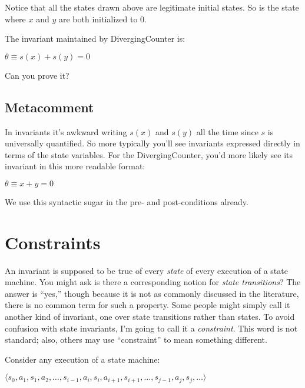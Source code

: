 \noindent Notice that all the states drawn above are legitimate initial states.
So is the state where $x$ and $y$ are both initialized to 0.

The invariant maintained by DivergingCounter is:

\begin{center}
$\theta \equiv s(x) + s(y) = 0$
\end{center}

\noindent Can you prove it?

\subsection{Metacomment}

In invariants it's awkward writing $s(x)$ and $s(y)$ all
the time since $s$ is universally quantified.  So more typically
you'll see invariants expressed directly in terms of the state
variables.
For the DivergingCounter, you'd more likely see its invariant in this
more readable format:

\begin{center}
$\theta \equiv x + y = 0$
\end{center}

\noindent We use this syntactic sugar
in the pre- and post-conditions already.
\section{Constraints}

An invariant is supposed to be true of every {\em state}
of every execution of a state machine.  You might ask is there
a corresponding notion for {\em state transitions}?  The answer is
``yes,''
though because it is not as
commonly discussed in the literature, there is no common term
for such a property.  Some people might simply call it another
kind of invariant, one over state transitions rather than states.
To avoid confusion with state invariants,
I'm going to call it a {\em constraint}.  
This word is not standard; also,
others may use ``constraint'' to mean something different.

Consider any execution of a state machine:

\begin{center}

$\langle s_0, a_1, s_1, a_2, \dots, s_{i-1}, a_i, s_i, a_{i+1}, s_{i+1}, \dots, s_{j-1}, a_j, s_j, \ldots \rangle$ 

\end{center}

